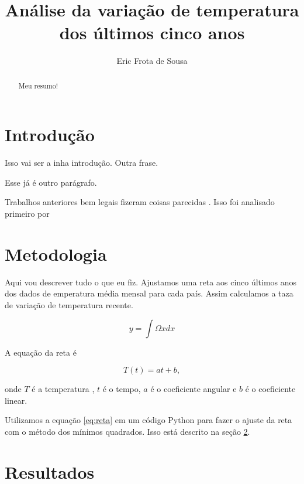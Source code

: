 \documentclass{article}
\begin{document}
\title{Análise da variação de temperatura dos últimos cinco anos}
\author{Eric Frota de Sousa}

\maketitle

\begin{abstract}
Meu resumo!
\end{abstract}

\section{Introdução}
Isso vai ser a inha introdução.
Outra frase.

Esse já é outro parágrafo.

Trabalhos anteriores bem legais fizeram coisas parecidas
\citep{Hansen2010}.
Isso foi analisado primeiro por \citet{Hansen2010}

\section{Metodologia}
\label{sec:metodos}

Aqui vou descrever tudo o que eu fiz.
Ajustamos uma reta aos cinco últimos anos dos dados
de emperatura média mensal para cada país.
Assim calculamos a taza de variação de temperatura recente.



\begin{equation}
y = \int\Omega x dx
\end{equation}

A equação da reta é

\begin{equation}
T(t) = a t + b,
\label{eq:reta}
\end{equation}

\noindent
onde $T$ é a temperatura , $t$ é o tempo, $a$ é o coeficiente angular
e $b$ é o coeficiente linear.

Utilizamos a equação \ref{eq:reta} em um código Python para fazer o ajuste da
reta com o método dos mínimos quadrados.
Isso está descrito na seção \ref{sec:metodos}.


\section{Resultados}
\end{document}
